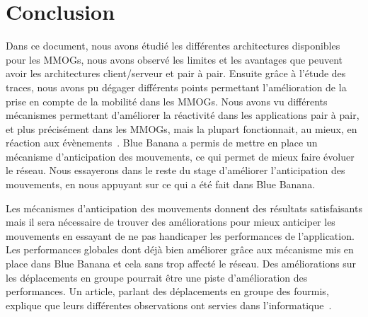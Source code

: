 \section{Conclusion}
	Dans ce document, nous avons étudié les différentes architectures disponibles pour les MMOGs, nous avons observé les limites et les avantages que peuvent avoir les architectures client/serveur et pair à pair. Ensuite grâce à l'étude des traces, nous avons pu dégager différents points permettant l'amélioration de la prise en compte de la mobilité dans les MMOGs. Nous avons vu différents mécanismes permettant d'améliorer la réactivité dans les applications pair à pair, et plus précisément dans les MMOGs, mais la plupart fonctionnait, au mieux, en réaction aux évènements~\cite{10.1109/SRDS.2006.33}. Blue Banana a permis de mettre en place un mécanisme d'anticipation des mouvements, ce qui permet de mieux faire évoluer le réseau. Nous essayerons dans le reste du stage d'améliorer l'anticipation des mouvements, en nous appuyant sur ce qui a été fait dans Blue Banana.\\

	\par Les mécanismes d'anticipation des mouvements donnent des résultats satisfaisants mais il sera nécessaire de trouver des améliorations pour mieux anticiper les mouvements en essayant de ne pas handicaper les performances de l'application. Les performances globales dont déjà bien améliorer grâce aux mécanisme mis en place dans Blue Banana et cela sans trop affecté le réseau. Des améliorations sur les déplacements en groupe pourrait être une piste d'amélioration des performances. Un  article, parlant des déplacements en groupe des fourmis, explique que leurs différentes observations ont servies dans l'informatique~\cite{fourmis}. 
		
